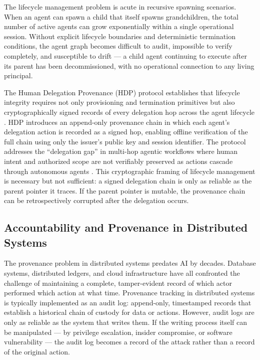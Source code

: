 The lifecycle management problem is acute in recursive spawning scenarios. When an agent can spawn a child that itself spawns grandchildren, the total number of active agents can grow exponentially within a single operational session. Without explicit lifecycle boundaries and deterministic termination conditions, the agent graph becomes difficult to audit, impossible to verify completely, and susceptible to drift — a child agent continuing to execute after its parent has been decommissioned, with no operational connection to any living principal.

The Human Delegation Provenance (HDP) protocol establishes that lifecycle integrity requires not only provisioning and termination primitives but also cryptographically signed records of every delegation hop across the agent lifecycle \cite{hdp2026,helixar2026}. HDP introduces an append-only provenance chain in which each agent's delegation action is recorded as a signed hop, enabling offline verification of the full chain using only the issuer's public key and session identifier. The protocol addresses the ``delegation gap'' in multi-hop agentic workflows where human intent and authorized scope are not verifiably preserved as actions cascade through autonomous agents \cite{arxiv2604.04522}. This cryptographic framing of lifecycle management is necessary but not sufficient: a signed delegation chain is only as reliable as the parent pointer it traces. If the parent pointer is mutable, the provenance chain can be retrospectively corrupted after the delegation occurs.

\subsection{Accountability and Provenance in Distributed Systems}
\label{sec:accountability-provenance}

The provenance problem in distributed systems predates AI by decades. Database systems, distributed ledgers, and cloud infrastructure have all confronted the challenge of maintaining a complete, tamper-evident record of which actor performed which action at what time. Provenance tracking in distributed systems is typically implemented as an audit log: append-only, timestamped records that establish a historical chain of custody for data or actions. However, audit logs are only as reliable as the system that writes them. If the writing process itself can be manipulated — by privilege escalation, insider compromise, or software vulnerability — the audit log becomes a record of the attack rather than a record of the original action.


